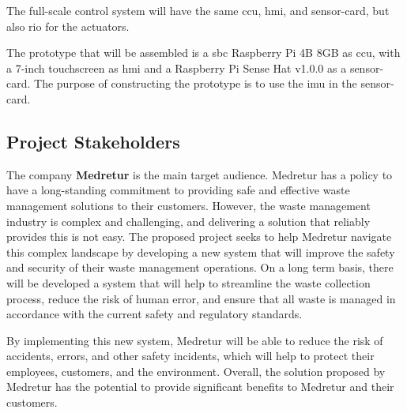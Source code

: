 \documentclass[../main.tex]{subfiles}
\begin{document}
The full-scale control system will have the same \gls{ccu},
\gls{hmi}, and \gls{sensor-card}, but also \gls{rio} for the \glspl{actuator}.

The prototype that will be assembled is a \gls{sbc}
Raspberry Pi 4B 8GB\cite{pi} as \gls{ccu}, with a 7-inch touchscreen\cite{pi-screen} as \gls{hmi}
and a Raspberry Pi Sense Hat v1.0.0\cite{pi-sense-hat} as a \gls{sensor-card}.
The purpose of constructing the prototype is to use the \gls{imu} in
the \gls{sensor-card}.

\subsection{Project Stakeholders}

The company \textbf{Medretur} is the main target audience.
Medretur has a policy to have a long-standing commitment to
providing safe and effective waste management solutions to their
customers\cite{medretur-vision}.
However, the waste management industry is complex and
challenging, and delivering a solution that reliably provides
this is not easy. The proposed project seeks to help Medretur
navigate this complex landscape by developing a new system that
will improve the safety and security of their waste management
operations.
On a long term basis, there will be developed a system that will
help to streamline the waste collection process, reduce the risk
of human error, and ensure that all waste is managed in accordance
with the current safety and regulatory standards.

By implementing this new system, Medretur will be able to reduce
the risk of accidents, errors, and other safety incidents, which
will help to protect their employees, customers, and the
environment.
Overall, the solution proposed by Medretur has the potential to provide
significant benefits to Medretur and their customers.

\end{document}
